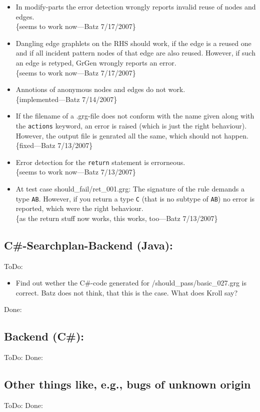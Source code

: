 \documentclass[12pt,a4paper]{article}
\begin{document}
\begin{itemize}
	\item In modify-parts the error detection wrongly reports invalid reuse of nodes and edges.\\
		\{seems to work now---Batz 7/17/2007\}
	\item Dangling edge graphlets on the RHS should work, if the edge is a reused one and if all incident pattern nodes of that edge are also reused.
    However, if such an edge is retyped, GrGen wrongly reports an error.\\
		\{seems to work now---Batz 7/17/2007\}
	\item Annotions of anonymous nodes and edges do not work.\\
		\{implemented---Batz 7/14/2007\}
	\item If the filename of a .grg-file does not conform with the name given along with the {\tt actions} keyword, an error is raised (which is just the right behaviour). However, the output file is genrated all the same, which should not happen.\\
    \{fixed---Batz 7/13/2007\}
	\item Error detection for the {\tt return} statement is errorneous.\\
		\{seems to work now---Batz 7/13/2007\}
	\item At test case should\_fail/ret\_001.grg:
  	The signature of the rule demands a type {\tt AB}.
	However, if you return a type {\tt C} (that is no subtype of {\tt AB}) no error is reported, which were the right behaviour.\\
		\{as the return stuff now works, this works, too---Batz 7/13/2007\}
\end{itemize}



\subsection*{C\#-Searchplan-Backend (Java):}
ToDo:
\begin{itemize}
	\item Find out wether the C\#-code generated for {/should\_pass/basic\_027.grg} is correct. Batz does not think, that this is the case. What does Kroll say?
\end{itemize}
Done:



\subsection*{Backend (C\#):}
ToDo:
Done:



\subsection*{Other things like, e.g., bugs of unknown origin}
ToDo:
Done:
\end{document}
